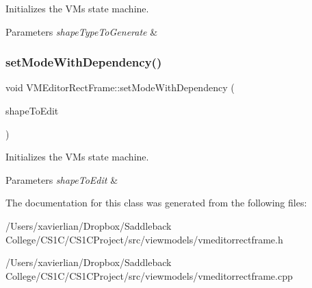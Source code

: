 Initializes the VM\textquotesingle{}s state machine. 


\begin{DoxyParams}{Parameters}
{\em shape\+Type\+To\+Generate} & \\
\hline
\end{DoxyParams}
\mbox{\label{class_v_m_editor_rect_frame_abedc584604fbdc11e18898e7e0951dc3}} 
\subsubsection{\texorpdfstring{setModeWithDependency()}{setModeWithDependency()}\hspace{0.1cm}{\footnotesize\ttfamily [2/2]}}
{\footnotesize\ttfamily void V\+M\+Editor\+Rect\+Frame\+::set\+Mode\+With\+Dependency (\begin{DoxyParamCaption}\item[{\mbox{\hyperlink{class_i_shape}{I\+Shape}} $\ast$}]{shape\+To\+Edit }\end{DoxyParamCaption})}



Initializes the VM\textquotesingle{}s state machine. 


\begin{DoxyParams}{Parameters}
{\em shape\+To\+Edit} & \\
\hline
\end{DoxyParams}


The documentation for this class was generated from the following files\+:\begin{DoxyCompactItemize}
\item 
/\+Users/xavierlian/\+Dropbox/\+Saddleback College/\+C\+S1\+C/\+C\+S1\+C\+Project/src/viewmodels/vmeditorrectframe.\+h\item 
/\+Users/xavierlian/\+Dropbox/\+Saddleback College/\+C\+S1\+C/\+C\+S1\+C\+Project/src/viewmodels/vmeditorrectframe.\+cpp\end{DoxyCompactItemize}
